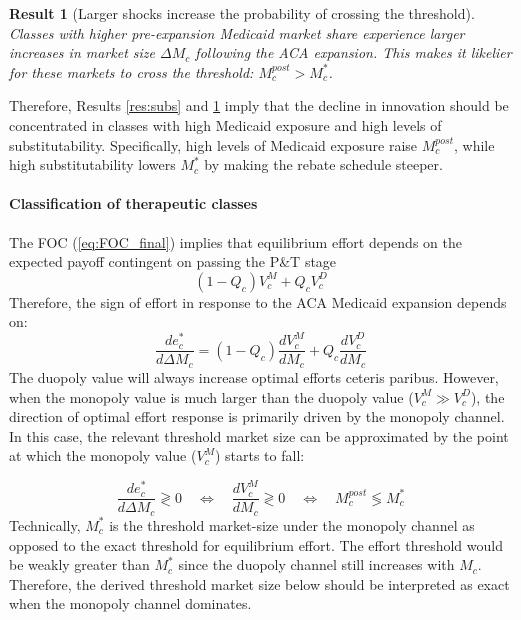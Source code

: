 \documentclass[12pt]{article}
\newtheorem{result}{Result}
\begin{document}
\begin{result}[Larger shocks increase the probability of crossing the threshold] \label{res:shock}
Classes with higher pre-expansion Medicaid market share experience larger increases in market size $\Delta M_c$ following the ACA expansion. This makes it likelier for these markets to cross the threshold: $M_c^{post} > M_c^*$.
\end{result}

Therefore, Results \ref{res:subs} and \ref{res:shock} imply that the decline in innovation should be concentrated in classes with high Medicaid exposure and high levels of substitutability. Specifically, high levels of Medicaid exposure raise $M_c^{post}$, while high substitutability lowers $M_c^*$ by making the rebate schedule steeper. 

\paragraph{Classification of therapeutic classes}
The FOC (\ref{eq:FOC_final}) implies that equilibrium effort depends on the expected payoff contingent on passing the P\&T stage
\[
(1-Q_c)V_c^M + Q_c V_c^D 
\]
Therefore, the sign of effort in response to the ACA Medicaid expansion depends on:
\begin{equation} \label{eq:effort_sign_full}
\frac{de^*_c}{d\Delta M_c} = (1-Q_c)\frac{dV_c^M}{dM_c} + Q_c \frac{dV_c^D}{dM_c}
\end{equation}
The duopoly value will always increase optimal efforts ceteris paribus. However, when the monopoly value is much larger than the duopoly value ($V_c^M \gg V_c^D$), the direction of optimal effort response is primarily driven by the monopoly channel. In this case, the relevant threshold market size can be approximated by the point at which the monopoly value ($V_c^M$) starts to fall:

\begin{equation} \label{eq:effort_sign}
    \frac{de_c^*}{d\Delta M_c} \gtrless 0 \quad \Longleftrightarrow \quad \frac{dV_c^M}{dM_c} \gtrless 0 \quad \Longleftrightarrow \quad M_c^{post} \lessgtr M_c^*
\end{equation}
Technically, $M_c^*$ is the threshold market-size under the monopoly channel as opposed to the exact threshold for equilibrium effort. The effort threshold would be weakly greater than $M_c^*$ since the duopoly channel still increases with $M_c$. Therefore, the derived threshold market size below should be interpreted as exact when the monopoly channel dominates.
\end{document}
